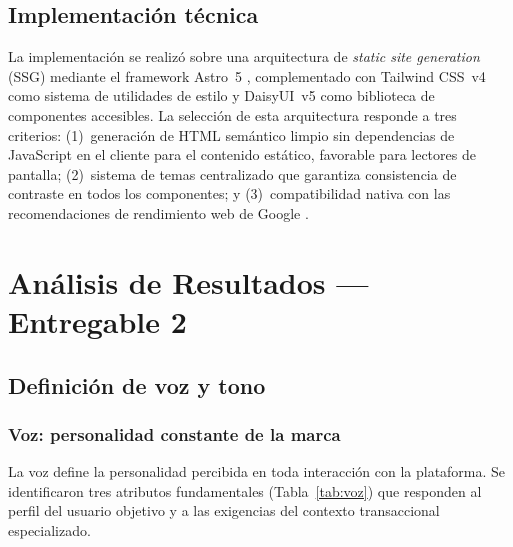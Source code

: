 \documentclass[conference]{IEEEtran}
\begin{document}
\subsection{Implementación técnica}

La implementación se realizó sobre una arquitectura de \textit{static site generation} (SSG) mediante el framework Astro~5 \cite{astro-docs}, complementado con Tailwind CSS~v4 \cite{tailwind-docs} como sistema de utilidades de estilo y DaisyUI~v5 \cite{daisyui-docs} como biblioteca de componentes accesibles. La selección de esta arquitectura responde a tres criterios: (1)~generación de HTML semántico limpio sin dependencias de JavaScript en el cliente para el contenido estático, favorable para lectores de pantalla; (2)~sistema de temas centralizado que garantiza consistencia de contraste en todos los componentes; y (3)~compatibilidad nativa con las recomendaciones de rendimiento web de Google \cite{web-vitals}.

\section{Análisis de Resultados — Entregable 2}

\subsection{Definición de voz y tono}

\subsubsection{Voz: personalidad constante de la marca}

La voz define la personalidad percibida en toda interacción con la plataforma. Se identificaron tres atributos fundamentales (Tabla~\ref{tab:voz}) que responden al perfil del usuario objetivo y a las exigencias del contexto transaccional especializado.
\end{document}
